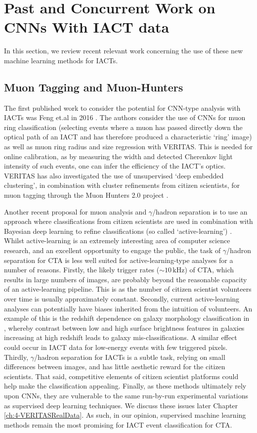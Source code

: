 \section{Past and Concurrent Work on CNNs With IACT data}
In this section, we review recent relevant work concerning the use of these new machine learning methods for IACTs.

\subsection{Muon Tagging and Muon-Hunters}
The first published work to consider the potential for CNN-type analysis with IACTs was Feng et.al in 2016 \cite{feng2016}. The authors consider the use of CNNs for muon ring classification (selecting events where a muon has passed directly down the optical path of an IACT and has therefore produced a characteristic `ring' image) as well as muon ring radius and size regression with VERITAS. This is needed for online calibration, as by measuring the width and detected Cherenkov light intensity of such events, one can infer the efficiency of the IACT's optics. VERITAS has also investigated the use of unsupervised `deep embedded clustering', in combination with cluster refinements from citizen scientists, for muon tagging through the Muon Hunters 2.0 project \cite{muonhunters2}.

Another recent proposal for muon analysis and $\gamma$/hadron separation is to use an approach where classifications from citizen scientists are used in combination with Bayesian deep learning to refine classifications (so called `active-learning') \cite{fortsonpc}. Whilst active-learning is an extremely interesting area of computer science research, and an excellent opportunity to engage the public, the task of $\gamma$/hadron separation for CTA is less well suited for active-learning-type analyses for a number of reasons. Firstly, the likely trigger rates ($\mathrm{\sim10\,kHz}$) \cite{trigrate} of CTA, which results in large numbers of images, are probably beyond the reasonable capacity of an active-learning pipeline. This is as the number of citizen scientist volunteers over time is usually approximately constant. Secondly, current active-learning analyses can potentially have biases inherited from the intuition of volunteers. An example of this is the redshift dependence on galaxy morphology classification in \cite{mike}, whereby contrast between low and high surface brightness features in galaxies increasing at high redshift leads to galaxy mis-classifications. A similar effect could occur in IACT data for low-energy events with few triggered pixels. Thirdly, $\gamma$/hadron separation for IACTs is a subtle task, relying on small differences between images, and has little aesthetic reward for the citizen scientists. That said, competitive elements of citizen scientist platforms could help make the classification appealing. Finally, as these methods ultimately rely upon CNNs, they are vulnerable to the same run-by-run experimental variations as supervised deep learning techniques. We discuss these issues later Chapter \ref{ch:4-VERITASRealData}. As such, in our opinion, supervised machine learning methods remain the most promising for IACT event classification for CTA.

